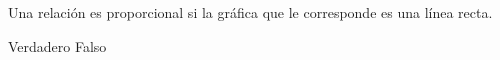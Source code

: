 Una relación es proporcional si la gráfica que le corresponde es una línea recta.

\begin{choices}
    \CorrectChoice Verdadero
    \choice Falso
\end{choices}